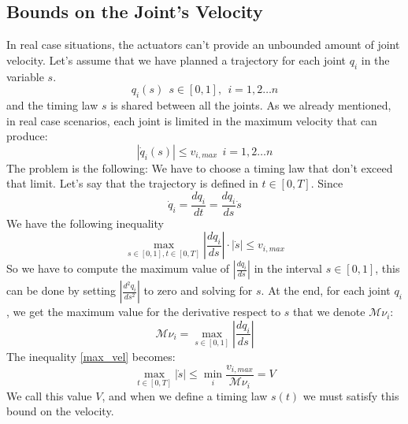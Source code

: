 \documentclass[10pt, letterpaper]{report}
\begin{document}
\subsection{Bounds on the Joint's Velocity}
In real case situations, the actuators can't provide an unbounded amount of joint velocity. Let's assume that we have planned a trajectory for each joint $q_i$ in the variable $s$.\begin{equation}
    q_i(s) \ \ s\in [0,1], \ \ i=1,2\dots n
\end{equation}
and the timing law $s$ is shared between all the joints. As we already mentioned, in real case scenarios, each joint is limited in the maximum velocity that can produce:\begin{equation}
    |\dot q_i(s)|\le v_{i,max}  \ \ i=1,2\dots n
\end{equation}
The problem is the following: We have to choose a timing law that don't exceed that limit. Let's say that the trajectory is defined in $t\in[0,T]$. Since\begin{equation}
    \dot q_i =\frac{dq_i}{dt} = \frac{dq_i}{ds}\dot s
\end{equation}
We have the following inequality\begin{equation}\label{max_vel}
    \max_{s\in[0,1], t\in [0,T]}\left|
        \frac{dq_i}{ds}
    \right|\cdot \left|
        \dot s
    \right| \le v_{i,max}
\end{equation}
So we have to compute the maximum value of $\displaystyle\left|
        \frac{dq_i}{ds}
\right|$ in the interval $s\in[0,1]$, this can be done by setting $\left|
        \frac{d^2q_i}{ds^2}
\right|$ to zero and solving for $s$. At the end, for each joint $q_i$, we get the maximum value for the derivative respect to $s$ that we denote ${\mathcal{M}\nu_i}$:\begin{equation}
    {\mathcal{M}\nu_i}=\max_{s\in[0,1]}\left|
        \frac{dq_i}{ds}
    \right|
\end{equation}
The inequality \eqref{max_vel} becomes:\begin{equation}
    \max_{t\in[0,T]}|\dot s|\le \min_i \frac{v_{i,max}}{{\mathcal{M}\nu_i}}=V
\end{equation}
We call this value $V$, and when we define a timing law $s(t)$ we must satisfy this bound on the velocity.\bigskip
\end{document}
